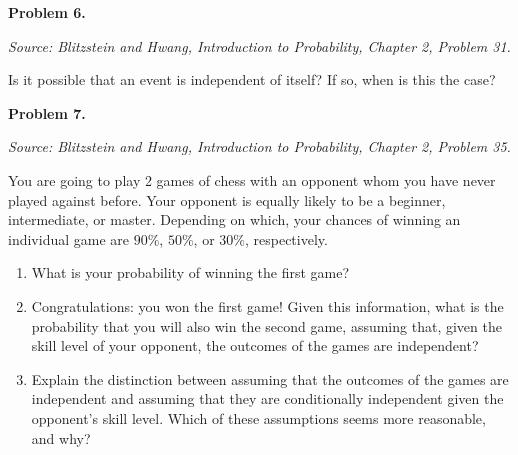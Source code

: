 \documentclass[11pt]{article}
\newcommand{\source}[1]{%
    \vspace{0.15cm}
    {\small\textit{Source: Blitzstein and Hwang, \textit{Introduction to Probability}, Chapter 2, Problem #1.}}
}
\begin{document}
\vfill


\newpage


\begin{problemheader}
\textbf{Problem 6. }
\end{problemheader}
\source{31}

Is it possible that an event is independent of itself? If so, when is this the case?

\vfill


\newpage


\begin{problemheader}
\textbf{Problem 7. }
\end{problemheader}
\source{35}

You are going to play 2 games of chess with an opponent whom you have never played against before. Your opponent is equally likely to be a beginner, intermediate, or master. Depending on which, your chances of winning an individual game are $90\%$, $50\%$, or $30\%$, respectively.

\begin{enumerate}[label=(\alph*), leftmargin=*]
    \item What is your probability of winning the first game?

    \item Congratulations: you won the first game! Given this information, what is the probability that you will also win the second game, assuming that, given the skill level of your opponent, the outcomes of the games are independent?

    \item Explain the distinction between assuming that the outcomes of the games are independent and assuming that they are conditionally independent given the opponent's skill level. Which of these assumptions seems more reasonable, and why?
\end{enumerate}

\vfill
\end{document}
